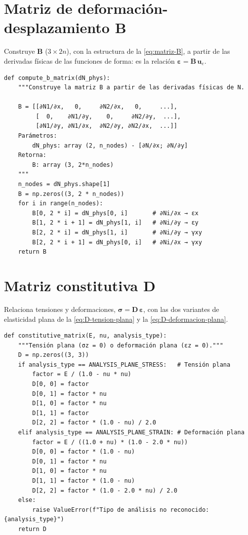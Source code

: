 \section{Matriz de deformación-desplazamiento \texorpdfstring{$\bm{B}$}{B}}

Construye $\bm{B}$ ($3\times 2n$), con la estructura de la \autoref{eq:matriz-B}, a partir de las derivadas físicas de las funciones de forma: es la relación $\bm{\varepsilon} = \bm{B}\,\bm{u}_e$.

\begin{lstlisting}
def compute_b_matrix(dN_phys):
    """Construye la matriz B a partir de las derivadas físicas de N.

    B = [[∂N1/∂x,   0,     ∂N2/∂x,   0,     ...],
         [  0,    ∂N1/∂y,    0,     ∂N2/∂y,  ...],
         [∂N1/∂y, ∂N1/∂x,  ∂N2/∂y, ∂N2/∂x,  ...]]
    Parámetros:
        dN_phys: array (2, n_nodes) - [∂N/∂x; ∂N/∂y]
    Retorna:
        B: array (3, 2*n_nodes)
    """
    n_nodes = dN_phys.shape[1]
    B = np.zeros((3, 2 * n_nodes))
    for i in range(n_nodes):
        B[0, 2 * i] = dN_phys[0, i]       # ∂Ni/∂x → εx
        B[1, 2 * i + 1] = dN_phys[1, i]   # ∂Ni/∂y → εy
        B[2, 2 * i] = dN_phys[1, i]       # ∂Ni/∂y → γxy
        B[2, 2 * i + 1] = dN_phys[0, i]   # ∂Ni/∂x → γxy
    return B
\end{lstlisting}

\section{Matriz constitutiva \texorpdfstring{$\bm{D}$}{D}}

Relaciona tensiones y deformaciones, $\bm{\sigma} = \bm{D}\,\bm{\varepsilon}$, con las dos variantes de elasticidad plana de la \autoref{eq:D-tension-plana} y la \autoref{eq:D-deformacion-plana}.

\begin{lstlisting}
def constitutive_matrix(E, nu, analysis_type):
    """Tensión plana (σz = 0) o deformación plana (εz = 0)."""
    D = np.zeros((3, 3))
    if analysis_type == ANALYSIS_PLANE_STRESS:   # Tensión plana
        factor = E / (1.0 - nu * nu)
        D[0, 0] = factor
        D[0, 1] = factor * nu
        D[1, 0] = factor * nu
        D[1, 1] = factor
        D[2, 2] = factor * (1.0 - nu) / 2.0
    elif analysis_type == ANALYSIS_PLANE_STRAIN: # Deformación plana
        factor = E / ((1.0 + nu) * (1.0 - 2.0 * nu))
        D[0, 0] = factor * (1.0 - nu)
        D[0, 1] = factor * nu
        D[1, 0] = factor * nu
        D[1, 1] = factor * (1.0 - nu)
        D[2, 2] = factor * (1.0 - 2.0 * nu) / 2.0
    else:
        raise ValueError(f"Tipo de análisis no reconocido: {analysis_type}")
    return D
\end{lstlisting}

